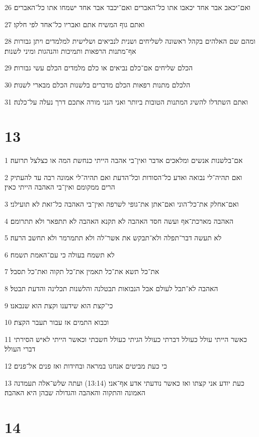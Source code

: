 \par 26 ואם־יכאב אבר אחד יכאבו אתו כל־האברים ואם־יכבד אבר אחד ישמחו אתו כל־האברים׃
\par 27 ואתם גוף המשיח אתם ואבריו כל־אחד לפי חלקו׃
\par 28 ומהם שם האלהים בקהל ראשונה לשליחים ושנית לנביאים ושלישית למלמדים ויתן גבורות אף־מתנות הרפאות ותמיכות והנהגות ומיני לשנות׃
\par 29 הכלם שליחים אם־כלם נביאים או כלם מלמדים הכלם עשי גבורות׃
\par 30 הלכלם מתנות רפאות הכלם מדברים בלשנות הכלם מבארי לשנות׃
\par 31 ואתם השתדלו להשיג המתנות הטובות ביותר ואני הנני מורה אתכם דרך נעלה על־כלנה׃

\chapter{13}

\par 1 אם־בלשנות אנשים ומלאכים אדבר ואין־בי אהבה הייתי כנחשת המה או כצלצל תרועה׃
\par 2 ואם תהיה־לי נבואה ואדע כל־הסודות וכל־הדעת ואם תהיה־לי אמונה רבה עד להעתיק הרים ממקומם ואין־בי האהבה הייתי כאין׃
\par 3 ואם־אחלק את־כל־הוני ואם־אתן את־גופי לשרפה ואין־בי האהבה כל־זאת לא תועילני׃
\par 4 האהבה מארכת־אף ועשה חסד האהבה לא תקנא האהבה לא תתפאר ולא תתרומם׃
\par 5 לא תעשה דבר־תפלה ולא־תבקש את אשר־לה ולא תתמרמר ולא תחשב הרעה׃
\par 6 לא תשמח בעולה כי עם־האמת תשמח׃
\par 7 את־כל תשא את־כל תאמין את־כל תקוה ואת־כל תסבל׃
\par 8 האהבה לא־תבל לעולם אבל הנבואות תבטלנה והלשנות תכלינה והדעת תבטל׃
\par 9 כי־קצת הוא שידענו וקצת הוא שנבאנו׃
\par 10 וכבוא התמים אז עבור תעבר הקצת׃
\par 11 כאשר הייתי עולל כעולל דברתי כעולל הגיתי כעולל חשבתי וכאשר הייתי לאיש הסירתי דברי העולל׃
\par 12 כי כעת מביטים אנחנו במראה ובחידות ואז פנים אל־פנים׃
\par 13 כעת יודע אני קצתו ואז כאשר נודעתי אדע אף־אני׃ (13:14) ועתה שלש־אלה תעמדנה האמונה והתקוה והאהבה והגדולה שבהן היא האהבה׃

\chapter{14}

